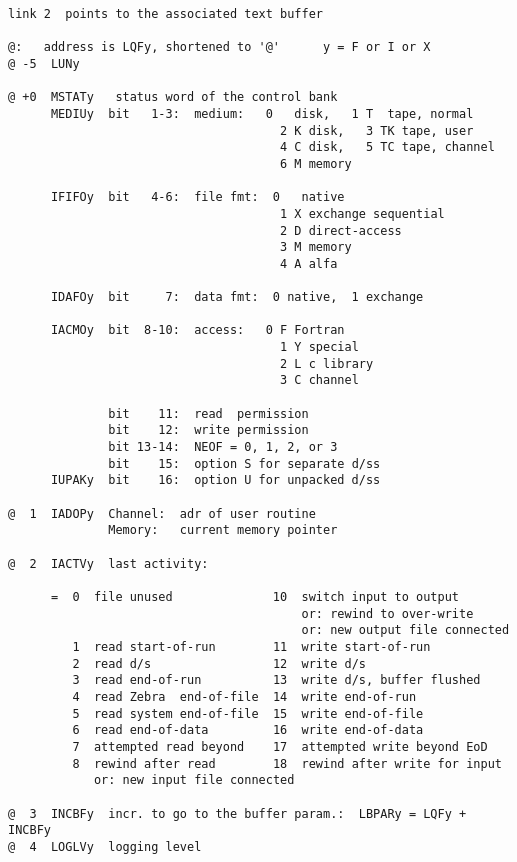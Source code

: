 \begin{verbatim}
link 2  points to the associated text buffer

@:   address is LQFy, shortened to '@'      y = F or I or X
@ -5  LUNy

@ +0  MSTATy   status word of the control bank
      MEDIUy  bit   1-3:  medium:   0   disk,   1 T  tape, normal
                                      2 K disk,   3 TK tape, user
                                      4 C disk,   5 TC tape, channel
                                      6 M memory

      IFIFOy  bit   4-6:  file fmt:  0   native
                                      1 X exchange sequential
                                      2 D direct-access
                                      3 M memory
                                      4 A alfa

      IDAFOy  bit     7:  data fmt:  0 native,  1 exchange

      IACMOy  bit  8-10:  access:   0 F Fortran
                                      1 Y special
                                      2 L c library
                                      3 C channel

              bit    11:  read  permission
              bit    12:  write permission
              bit 13-14:  NEOF = 0, 1, 2, or 3
              bit    15:  option S for separate d/ss
      IUPAKy  bit    16:  option U for unpacked d/ss

@  1  IADOPy  Channel:  adr of user routine
              Memory:   current memory pointer

@  2  IACTVy  last activity:

      =  0  file unused              10  switch input to output
                                         or: rewind to over-write
                                         or: new output file connected
         1  read start-of-run        11  write start-of-run
         2  read d/s                 12  write d/s
         3  read end-of-run          13  write d/s, buffer flushed
         4  read Zebra  end-of-file  14  write end-of-run
         5  read system end-of-file  15  write end-of-file
         6  read end-of-data         16  write end-of-data
         7  attempted read beyond    17  attempted write beyond EoD
         8  rewind after read        18  rewind after write for input
            or: new input file connected

@  3  INCBFy  incr. to go to the buffer param.:  LBPARy = LQFy + INCBFy
@  4  LOGLVy  logging level


\end{verbatim}
